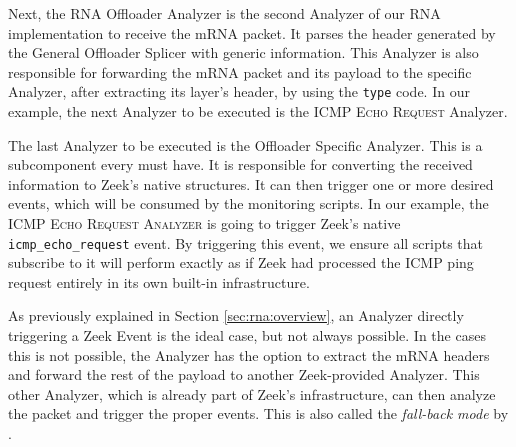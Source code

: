 
Next, the RNA Offloader Analyzer is the second Analyzer of our RNA implementation to receive the mRNA packet. It parses the header generated by the General Offloader Splicer with \Offloader{} generic information. This Analyzer is also responsible for forwarding the mRNA packet and its payload to the \Offloader{} specific Analyzer, after extracting its layer's header, by using the \Offloader{} \texttt{type} code. In our example, the next Analyzer to be executed is the \textsc{ICMP Echo Request} Analyzer.

The last Analyzer to be executed is the Offloader Specific Analyzer. This is a subcomponent every \Offloader{} must have. It is responsible for converting the received information to Zeek's native structures. It can then trigger one or more desired events, which will be consumed by the monitoring scripts. In our example, the \textsc{ICMP Echo Request Analyzer} is going to trigger Zeek's native \texttt{icmp\_echo\_request} event. By triggering this event, we ensure all scripts that subscribe to it will perform exactly as if Zeek had processed the ICMP ping request entirely in its own built-in infrastructure.

As previously explained in Section \ref{sec:rna:overview}, an Analyzer directly triggering a Zeek Event is the ideal case, but not always possible. In the cases this is not possible, the Analyzer has the option to extract the mRNA headers and forward the rest of the payload to another Zeek-provided Analyzer. This other Analyzer, which is already part of Zeek's infrastructure, can then analyze the packet and trigger the proper events. This is also called the \textit{fall-back mode} by .
